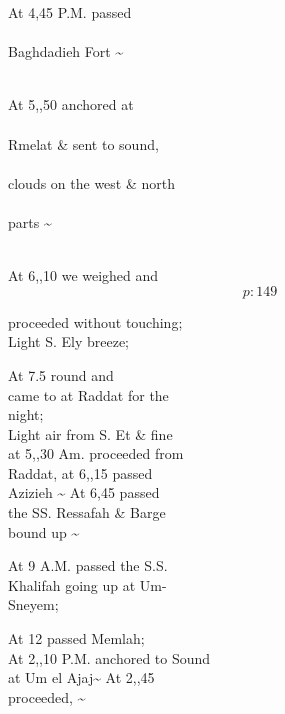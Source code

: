 \documentclass{report}
\begin{document}
	\par{
 	At 4,45 P.M. passed\ \\\ \\Baghdadieh Fort \~{}\ \\\ \\
	}

	\par{
 	At 5,,50 anchored at\ \\\ \\Rmelat \& sent to sound,\ \\\ \\clouds on the west \& north\ \\\ \\parts \~{}\ \\\ \\
	}

	\par{
 	At 6,,10 we weighed and\ \\
  \[p: 149 \]

	}


	\par{
 	proceeded without touching;\ \\Light S. Ely breeze;\ \\
	}

	\par{
 	At 7.5 round and\ \\came to at Raddat for the\ \\night;\ \\Light air from S. Et \& fine\ \\at 5,,30 Am. proceeded from\ \\Raddat, at 6,,15 passed\ \\Azizieh \~{} At 6,45 passed\ \\the SS. Ressafah \& Barge\ \\bound up \~{}\ \\
	}

	\par{
 	At 9 A.M. passed the S.S.\ \\Khalifah going up at Um-\ \\Sneyem;\ \\
	}

	\par{
 	At 12 passed Memlah;\ \\At 2,,10 P.M. anchored to Sound\ \\at Um el Ajaj\~{} At 2,,45\ \\proceeded, \~{}\ \\
	}
\end{document}
